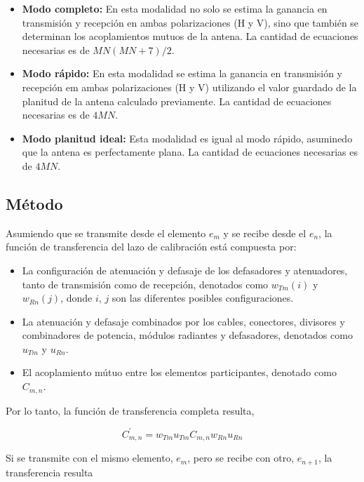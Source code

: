 \begin{itemize}
	\item \textbf{Modo completo:} En esta modalidad no solo se estima la ganancia en transmisión y recepción en ambas 
		polarizaciones (H y V), sino que también se determinan los acoplamientos mutuos de la antena. La cantidad de ecuaciones necesarias es 
		de $MN(MN + 7)/2$.
	\item \textbf{Modo rápido:} En esta modalidad se estima la ganancia en transmisión y recepción em ambas polarizaciones
		(H y V) utilizando el valor guardado de la planitud de la antena calculado previamente. La cantidad de ecuaciones necesarias
		es de $4MN$.
	\item \textbf{Modo planitud ideal:} Esta modalidad es igual al modo rápido, asuminedo que la antena es perfectamente plana. 
		La cantidad de ecuaciones necesarias es de $4MN$.
\end{itemize}




\subsection{Método}

Asumiendo que se transmite desde el elemento $e_m$ y se recibe desde el $e_n$, la función de transferencia del lazo de 
calibración está compuesta por:

\begin{itemize}
	\item La configuración de atenuación y defasaje de los defasadores y atenuadores, tanto de transmisión como de recepción, 
		denotados como $w_{Tm}(i)$ y $w_{Rn}(j)$, donde $i$, $j$ son las diferentes posibles configuraciones. 
	\item La atenuación y defasaje combinados por los cables, conectores, divisores y combinadores de potencia, módulos radiantes
		y defasadores, denotados como $u_{Tm}$ y $u_{Rn}$. 
	\item El acoplamiento mútuo entre los elementos participantes, denotado como $C_{m, n}$.
\end{itemize}
		
Por lo tanto, la función de transferencia completa resulta,

\begin{equation}
	C^{'}_{m,n} = w_{Tm} u_{Tm} C_{m,n} w_{Rn} u_{Rn}
	\label{eq:transfer_mn}
\end{equation}

Si se transmite con el mismo elemento, $e_m$, pero se recibe con otro, $e_{n + 1}$, la transferencia resulta

